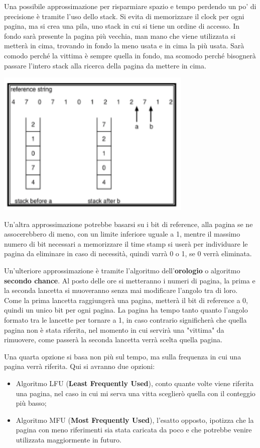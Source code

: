 \documentclass[a4paper, 12pt]{book}
\begin{document}
Una possibile approssimazione per risparmiare spazio e tempo perdendo un po' di precisione è tramite l'uso dello stack. Si evita di 
memorizzare il clock per ogni pagina, ma si crea una pila, uno stack in cui si tiene un ordine di accesso. In fondo sarà presente 
la pagina più vecchia, man mano che viene utilizzata si metterà in cima, trovando in fondo la meno usata e in cima la più usata. Sarà
comodo perché la vittima è sempre quella in fondo, ma scomodo perché bisognerà passare l'intero stack alla ricerca della pagina 
da mettere in cima.

\begin{center}
    \includegraphics[width=0.7\textwidth]{LRU_approx.png}
\end{center}

Un'altra approssimazione potrebbe basarsi su i bit di reference, alla pagina se ne assocerebbero di meno, con un limite inferiore 
uguale a 1, mentre il massimo numero di bit necessari a memorizzare il time stamp si userà per individuare le pagina da eliminare
in caso di necessità, quindi varrà 0 o 1, se 0 verrà eliminata.

Un'ulteriore approssimazione è tramite l'algoritmo dell'\textbf{orologio} o algoritmo \textbf{secondo chance}. Al posto delle ore 
si metteranno i numeri di pagina, la prima e la seconda lancetta si muoveranno senza mai modificare l'angolo tra di loro. Come 
la prima lancetta raggiungerà una pagina, metterà il bit di reference a 0, quindi un unico bit per ogni pagina. La pagina ha tempo 
tanto quanto l'angolo formato tra le lancette per tornare a 1, in caso contrario significherà che quella pagina non è stata riferita,
nel momento in cui servirà una "vittima" da rimuovere, come passerà la seconda lancetta verrà scelta quella pagina.

Una quarta opzione si basa non più sul tempo, ma sulla frequenza in cui una pagina verrà riferita. Qui si avranno due opzioni:
\begin{itemize}
    \item Algoritmo LFU (\textbf{Least Frequently Used}), conto quante volte viene riferita una pagina, nel caso in cui mi serva 
    una vitta sceglierò quella con il conteggio più basso;
    \item Algoritmo MFU (\textbf{Most Frequently Used}), l'esatto opposto, ipotizza che la pagina con meno riferimenti sia stata 
    caricata da poco e che potrebbe venire utilizzata maggiormente in futuro.
\end{itemize}
\end{document}
